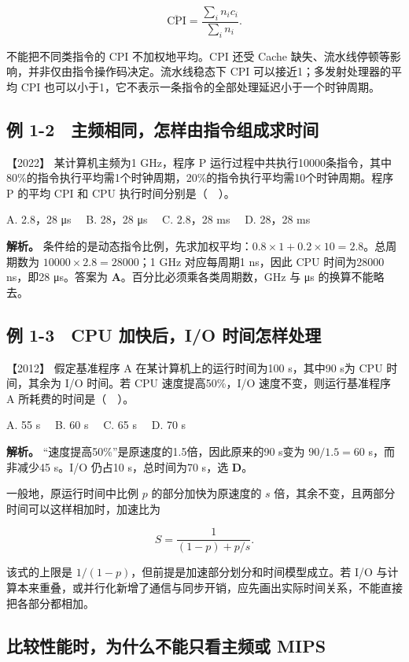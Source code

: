 \[
\overline{\mathrm{CPI}}=\frac{\sum_i n_i c_i}{\sum_i n_i}.
\]

不能把不同类指令的 CPI 不加权地平均。CPI 还受 Cache 缺失、流水线停顿等影响，并非仅由指令操作码决定。流水线稳态下 CPI 可以接近1；多发射处理器的平均 CPI 也可以小于1，它不表示一条指令的全部处理延迟小于一个时钟周期。

\subsection{例 1-2　主频相同，怎样由指令组成求时间}\label{co-ex1-2}

\noindent{}【2022】 某计算机主频为1 GHz，程序 P 运行过程中共执行10000条指令，其中80\%的指令执行平均需1个时钟周期，20\%的指令执行平均需10个时钟周期。程序 P 的平均 CPI 和 CPU 执行时间分别是（　）。

A. 2.8，28 μs　 B. 28，28 μs　 C. 2.8，28 ms　 D. 28，28 ms


\textbf{解析。} 条件给的是动态指令比例，先求加权平均：\(0.8\times1+0.2\times10=2.8\)。总周期数为 \(10000\times2.8=28000\)；1 GHz 对应每周期1 ns，因此 CPU 时间为28000 ns，即28 μs。答案为 \textbf{A}。百分比必须乘各类周期数，GHz 与 μs 的换算不能略去。

\subsection{例 1-3　CPU 加快后，I/O 时间怎样处理}\label{co-ex1-3}

\noindent{}【2012】 假定基准程序 A 在某计算机上的运行时间为100 s，其中90 s为 CPU 时间，其余为 I/O 时间。若 CPU 速度提高50\%，I/O 速度不变，则运行基准程序 A 所耗费的时间是（　）。

A. 55 s　 B. 60 s　 C. 65 s　 D. 70 s


\textbf{解析。} ``速度提高50\%''是原速度的1.5倍，因此原来的90 s变为 \(90/1.5=60\) s，而非减少45 s。I/O 仍占10 s，总时间为70 s，选 \textbf{D}。

一般地，原运行时间中比例 \(p\) 的部分加快为原速度的 \(s\) 倍，其余不变，且两部分时间可以这样相加时，加速比为

\[
S=\frac{1}{(1-p)+p/s}.
\]

该式的上限是 \(1/(1-p)\)，但前提是加速部分划分和时间模型成立。若 I/O 与计算本来重叠，或并行化新增了通信与同步开销，应先画出实际时间关系，不能直接把各部分都相加。

\subsection{比较性能时，为什么不能只看主频或 MIPS}\label{co-c01-h102}

